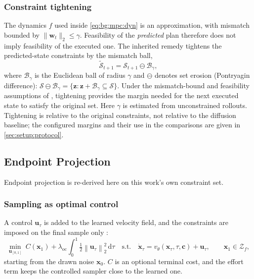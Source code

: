\documentclass[headsepline,footsepline,footinclude=false,oneside,fontsize=11pt,paper=a4,listof=totoc,bibliography=totoc]{scrbook}
\theoremstyle{definition}
\theoremstyle{plain}
\theoremstyle{remark}
\newcommand{\vect}[1]{\boldsymbol{#1}}
\newcommand{\sidx}[1]{_{\textrm{#1}}}
\newcommand{\dd}{\mathrm{d}}                   %
\newcommand{\vfield}{v}                        %
\newcommand{\ftime}{\tau}                      %
\begin{document}
\subsubsection*{Constraint tightening}

The dynamics $f$ used inside \eqref{eq:bg:mpc:dyn} is an approximation, with mismatch bounded
by $\|\vect{w}_{t}\|_{2}\le\gamma$. Feasibility of the \emph{predicted} plan therefore does not
imply feasibility of the executed one. The inherited remedy tightens the predicted-state
constraints by the mismatch ball,
\begin{equation}\label{eq:method:dpcc:tighten}
  \tilde{\mathcal{S}}_{t+1} = \mathcal{S}_{t+1}\ominus\mathcal{B}_{\gamma},
\end{equation}
where $\mathcal{B}_{\gamma}$ is the Euclidean ball of radius $\gamma$ and $\ominus$ denotes
set erosion (Pontryagin difference):
$\mathcal{S}\ominus\mathcal{B}_{\gamma}
=\{\vect{z}:\vect{z}+\mathcal{B}_{\gamma}\subseteq\mathcal{S}\}$.
Under the mismatch-bound and feasibility assumptions of
\parencite[Theorem~2]{romer2025diffusion}, tightening provides the margin needed for the next
executed state to satisfy the original set. Here $\gamma$ is estimated from unconstrained rollouts.
Tightening is relative to the original constraints, not relative to the diffusion baseline; the
configured margins and their use in the comparisons are given in \autoref{sec:setup:protocol}.

\subsection{Endpoint Projection}\label{sec:method:hardflow}

Endpoint projection \parencite{li2025hardflow} is re-derived here on this work's own constraint set.

\subsubsection*{Sampling as optimal control}

A control $\vect{u}_{\ftime}$ is added to the learned velocity field, and the constraints are imposed on
the final sample only \parencite[Problem~1]{li2025hardflow}:
\begin{equation}\label{eq:method:hf:oc}
  \min_{\vect{u}_{[0,1]}}\; C(\vect{x}_{1})
    + \lambda\sidx{oc}\int_{0}^{1}\tfrac{1}{2}\left\|\vect{u}_{\ftime}\right\|_{2}^{2}\,\dd\ftime
  \quad\text{s.t.}\quad
  \dot{\vect{x}}_{\ftime} = \vfield_{\theta}(\vect{x}_{\ftime},\ftime,\vect{c}) + \vect{u}_{\ftime},
  \qquad \vect{x}_{1}\in\mathcal{Z}_{f},
\end{equation}
starting from the drawn noise $\vect{x}_{0}$. $C$ is an optional terminal cost, and the effort term keeps
the controlled sampler close to the learned one.
\end{document}
